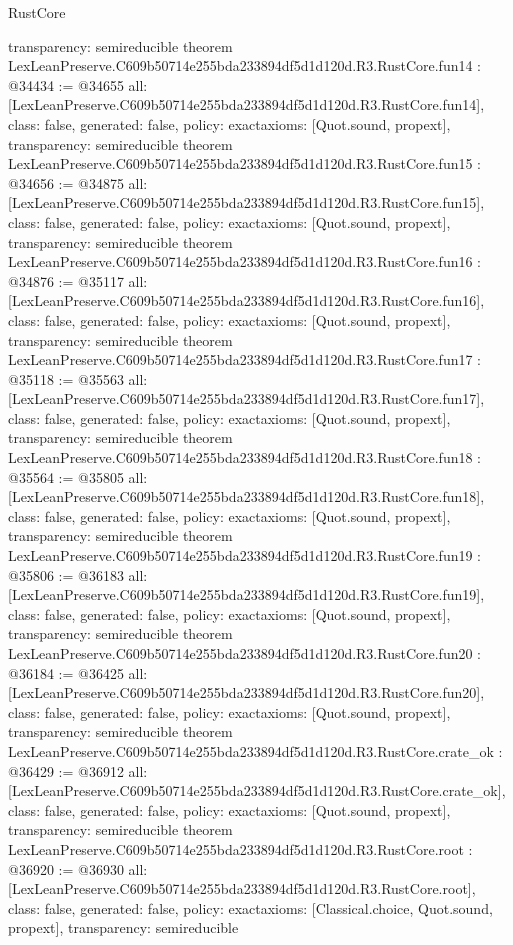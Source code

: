 \begin{lexlean}{RustCore}
\begin{coremodule}
{  transparency: semireducible
}
theorem LexLeanPreserve.C609b50714e255bda233894df5d1d120d.R3.RustCore.fun14 : @34434 := @34655 {
  all: [LexLeanPreserve.C609b50714e255bda233894df5d1d120d.R3.RustCore.fun14],
  class: false,
  generated: false,
  policy: exact{axioms: [Quot.sound, propext]},
  transparency: semireducible
}
theorem LexLeanPreserve.C609b50714e255bda233894df5d1d120d.R3.RustCore.fun15 : @34656 := @34875 {
  all: [LexLeanPreserve.C609b50714e255bda233894df5d1d120d.R3.RustCore.fun15],
  class: false,
  generated: false,
  policy: exact{axioms: [Quot.sound, propext]},
  transparency: semireducible
}
theorem LexLeanPreserve.C609b50714e255bda233894df5d1d120d.R3.RustCore.fun16 : @34876 := @35117 {
  all: [LexLeanPreserve.C609b50714e255bda233894df5d1d120d.R3.RustCore.fun16],
  class: false,
  generated: false,
  policy: exact{axioms: [Quot.sound, propext]},
  transparency: semireducible
}
theorem LexLeanPreserve.C609b50714e255bda233894df5d1d120d.R3.RustCore.fun17 : @35118 := @35563 {
  all: [LexLeanPreserve.C609b50714e255bda233894df5d1d120d.R3.RustCore.fun17],
  class: false,
  generated: false,
  policy: exact{axioms: [Quot.sound, propext]},
  transparency: semireducible
}
theorem LexLeanPreserve.C609b50714e255bda233894df5d1d120d.R3.RustCore.fun18 : @35564 := @35805 {
  all: [LexLeanPreserve.C609b50714e255bda233894df5d1d120d.R3.RustCore.fun18],
  class: false,
  generated: false,
  policy: exact{axioms: [Quot.sound, propext]},
  transparency: semireducible
}
theorem LexLeanPreserve.C609b50714e255bda233894df5d1d120d.R3.RustCore.fun19 : @35806 := @36183 {
  all: [LexLeanPreserve.C609b50714e255bda233894df5d1d120d.R3.RustCore.fun19],
  class: false,
  generated: false,
  policy: exact{axioms: [Quot.sound, propext]},
  transparency: semireducible
}
theorem LexLeanPreserve.C609b50714e255bda233894df5d1d120d.R3.RustCore.fun20 : @36184 := @36425 {
  all: [LexLeanPreserve.C609b50714e255bda233894df5d1d120d.R3.RustCore.fun20],
  class: false,
  generated: false,
  policy: exact{axioms: [Quot.sound, propext]},
  transparency: semireducible
}
theorem LexLeanPreserve.C609b50714e255bda233894df5d1d120d.R3.RustCore.crate_ok : @36429 := @36912 {
  all: [LexLeanPreserve.C609b50714e255bda233894df5d1d120d.R3.RustCore.crate_ok],
  class: false,
  generated: false,
  policy: exact{axioms: [Quot.sound, propext]},
  transparency: semireducible
}
theorem LexLeanPreserve.C609b50714e255bda233894df5d1d120d.R3.RustCore.root : @36920 := @36930 {
  all: [LexLeanPreserve.C609b50714e255bda233894df5d1d120d.R3.RustCore.root],
  class: false,
  generated: false,
  policy: exact{axioms: [Classical.choice, Quot.sound, propext]},
  transparency: semireducible
}


\end{coremodule}
\end{lexlean}
